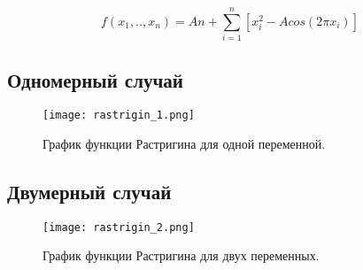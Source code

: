 \begin{equation}
\label{rastrigin_eq}
f(x_1, .., x_n) = An + \sum\limits_{i = 1}^n\left[ x_i^2 - Acos\left(2 \pi x_i \right)\right]
\end{equation}

\subsection{Одномерный случай}

\begin{figure}
    \centering
    \texttt{[image: rastrigin\_1.png]}
    \caption{График функции Растригина для одной переменной.}
    \label{rastrigin_plot}
\end{figure}

\subsection{Двумерный случай}

\begin{figure}
    \centering
    \texttt{[image: rastrigin\_2.png]}
    \caption{График функции Растригина для двух переменных.}
    \label{rastrigin_plot}
\end{figure}
